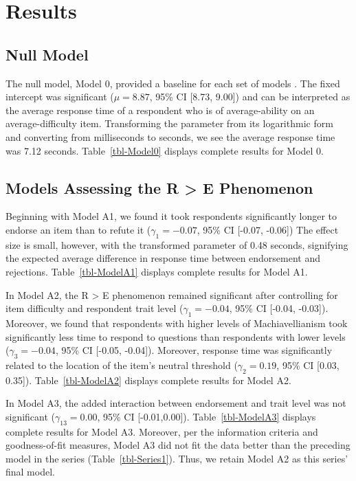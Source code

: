 \documentclass[
  number]{elsarticle}
\begin{document}
\section{Results}\label{results}

\subsection{Null Model}\label{null-model}

The null model, Model 0, provided a baseline for each set of models .
The fixed intercept was significant (\(μ=8.87\), 95\% CI {[}8.73,
9.00{]}) and can be interpreted as the average response time of a
respondent who is of average-ability on an average-difficulty item.
Transforming the parameter from its logarithmic form and converting from
milliseconds to seconds, we see the average response time was 7.12
seconds. Table~\ref{tbl-Model0} displays complete results for Model 0.

\subsection{Models Assessing the R \textgreater{} E
Phenomenon}\label{models-assessing-the-r-e-phenomenon}

Beginning with Model A1, we found it took respondents significantly
longer to endorse an item than to refute it (\(γ_1=-0.07\), 95\% CI
{[}-0.07, -0.06{]}) The effect size is small, however, with the
transformed parameter of 0.48 seconds, signifying the expected average
difference in response time between endorsement and rejections.
Table~\ref{tbl-ModelA1} displays complete results for Model A1.

In Model A2, the R \textgreater{} E phenomenon remained significant
after controlling for item difficulty and respondent trait level
(\(γ_1=-0.04\), 95\% CI {[}-0.04, -0.03{]}). Moreover, we found that
respondents with higher levels of Machiavellianism took significantly
less time to respond to questions than respondents with lower levels
(\(γ_3=-0.04\), 95\% CI {[}-0.05, -0.04{]}). Moreover, response time was
significantly related to the location of the item's neutral threshold
(\(γ_2=0.19\), 95\% CI {[}0.03, 0.35{]}). Table~\ref{tbl-ModelA2}
displays complete results for Model A2.

In Model A3, the added interaction between endorsement and trait level
was not significant (\(γ_{13}=0.00\), 95\% CI {[}-0.01,0.00{]}).
Table~\ref{tbl-ModelA3} displays complete results for Model A3.
Moreover, per the information criteria and goodness-of-fit measures,
Model A3 did not fit the data better than the preceding model in the
series (Table~\ref{tbl-Series1}). Thus, we retain Model A2 as this
series' final model.
\end{document}
